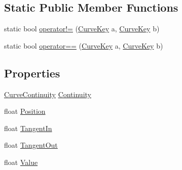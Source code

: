 \subsection*{Static Public Member Functions}
\begin{DoxyCompactItemize}
\item 
static bool \hyperlink{class_microsoft_1_1_xna_1_1_framework_1_1_curve_key_a9e16223831085faff2391b04ad15294e}{operator!=} (\hyperlink{class_microsoft_1_1_xna_1_1_framework_1_1_curve_key}{Curve\+Key} a, \hyperlink{class_microsoft_1_1_xna_1_1_framework_1_1_curve_key}{Curve\+Key} b)
\item 
static bool \hyperlink{class_microsoft_1_1_xna_1_1_framework_1_1_curve_key_a94663961fd90972b5acb2be751e1a974}{operator==} (\hyperlink{class_microsoft_1_1_xna_1_1_framework_1_1_curve_key}{Curve\+Key} a, \hyperlink{class_microsoft_1_1_xna_1_1_framework_1_1_curve_key}{Curve\+Key} b)
\end{DoxyCompactItemize}
\subsection*{Properties}
\begin{DoxyCompactItemize}
\item 
\hyperlink{namespace_microsoft_1_1_xna_1_1_framework_aa1e1dcccc97fa3f52759aa5807d9a326}{Curve\+Continuity} \hyperlink{class_microsoft_1_1_xna_1_1_framework_1_1_curve_key_af1b4033bd5c60fc87344a159a5595e36}{Continuity}
\item 
float \hyperlink{class_microsoft_1_1_xna_1_1_framework_1_1_curve_key_a0b8188424f81df6b86d5d19008120454}{Position}
\item 
float \hyperlink{class_microsoft_1_1_xna_1_1_framework_1_1_curve_key_a2ccb4d8eb9f226379a6a314d845c2ff9}{Tangent\+In}
\item 
float \hyperlink{class_microsoft_1_1_xna_1_1_framework_1_1_curve_key_ac8c283716d0603879e2cc804a724eb0f}{Tangent\+Out}
\item 
float \hyperlink{class_microsoft_1_1_xna_1_1_framework_1_1_curve_key_af3ba76d1681fa543d55fad1454eec24c}{Value}
\end{DoxyCompactItemize}


